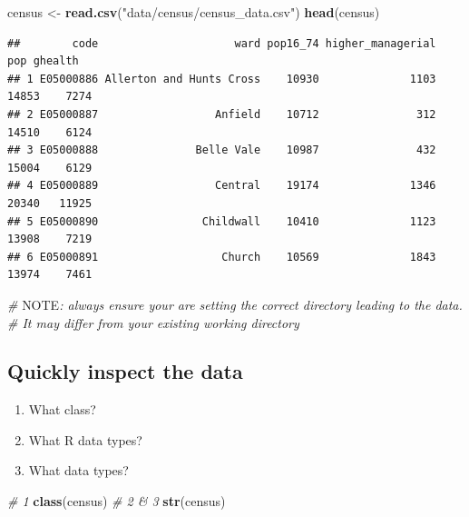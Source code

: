 \documentclass[
]{book}
\newenvironment{Shaded}{\begin{snugshade}}{\end{snugshade}}
\newcommand{\AlertTok}[1]{\textcolor[rgb]{0.94,0.16,0.16}{#1}}
\newcommand{\CommentTok}[1]{\textcolor[rgb]{0.56,0.35,0.01}{\textit{#1}}}
\newcommand{\KeywordTok}[1]{\textcolor[rgb]{0.13,0.29,0.53}{\textbf{#1}}}
\newcommand{\NormalTok}[1]{#1}
\newcommand{\StringTok}[1]{\textcolor[rgb]{0.31,0.60,0.02}{#1}}
\begin{document}
\begin{Shaded}
\begin{Highlighting}[]
\NormalTok{census <-}\StringTok{ }\KeywordTok{read.csv}\NormalTok{(}\StringTok{"data/census/census_data.csv"}\NormalTok{)}
\KeywordTok{head}\NormalTok{(census)}
\end{Highlighting}
\end{Shaded}

\begin{verbatim}
##        code                     ward pop16_74 higher_managerial   pop ghealth
## 1 E05000886 Allerton and Hunts Cross    10930              1103 14853    7274
## 2 E05000887                  Anfield    10712               312 14510    6124
## 3 E05000888               Belle Vale    10987               432 15004    6129
## 4 E05000889                  Central    19174              1346 20340   11925
## 5 E05000890                Childwall    10410              1123 13908    7219
## 6 E05000891                   Church    10569              1843 13974    7461
\end{verbatim}

\begin{Shaded}
\begin{Highlighting}[]
\CommentTok{# }\AlertTok{NOTE}\CommentTok{: always ensure your are setting the correct directory leading to the data. }
\CommentTok{# It may differ from your existing working directory}
\end{Highlighting}
\end{Shaded}

\hypertarget{quickly-inspect-the-data}{%
\subsection{Quickly inspect the data}\label{quickly-inspect-the-data}}

\begin{enumerate}
\def\labelenumi{\arabic{enumi}.}
\item
  What class?
\item
  What R data types?
\item
  What data types?
\end{enumerate}

\begin{Shaded}
\begin{Highlighting}[]
\CommentTok{# 1}
\KeywordTok{class}\NormalTok{(census)}
\CommentTok{# 2 & 3}
\KeywordTok{str}\NormalTok{(census)}
\end{Highlighting}
\end{Shaded}
\end{document}
